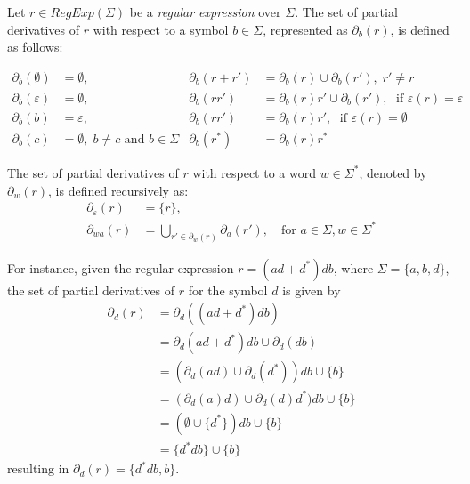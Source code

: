 Let $r \in RegExp(\Sigma)$ be a \textit{regular expression} over $\Sigma$. The set of partial derivatives of $r$ with respect to a symbol $b \in \Sigma$, represented as $\partial_b(r)$, is defined as follows:

\begin{align*}
	\partial_b(\emptyset) &= \emptyset,		&	\partial_b(r + r') &= \partial_b(r) \cup \partial_b(r'), \; r' \neq r \\
	\partial_b(\varepsilon) &= \emptyset,	&	\partial_b(r r') &= \partial_b(r)r' \cup \partial_b(r'), \; \text { if } \varepsilon(r) = \varepsilon \\
	\partial_b(b) &= \varepsilon, & \partial_b(r r') &= \partial_b(r)r', \; \text { if } \varepsilon(r) = \emptyset \\
	\partial_b(c) &= \emptyset, \; b \neq c \text{ and } b \in \Sigma & \partial_b(r^*) &= \partial_b(r)r^*
\end{align*}

The set of partial derivatives of $r$ with respect to a word $w \in \Sigma^*$, denoted by $\partial_w(r)$, is defined recursively as:
\begin{align*}
	\partial_{\varepsilon}(r) &= \{r\}, \\
	\partial_{wa}(r) &= \bigcup_{r' \in \partial_w(r)} \partial_a(r'), \quad \text{for $a \in \Sigma, w \in \Sigma^*$}
\end{align*}

For instance, given the regular expression $r = (ad + d^*)db$, where $\Sigma = \{a,b,d\}$, the set of partial derivatives of $r$ for the symbol $d$ is given by
\begin{align*}
	\partial_d(r) &= \partial_d((ad + d^*)db) \\
	&= \partial_d(ad+d^*)db \cup \partial_d(db) \\
	&= (\partial_d(ad) \cup \partial_d(d^*))db \cup \{b\} \\
	&= (\partial_d(a)d) \cup \partial_d(d)d^*)db \cup \{b\} \\
	&= (\emptyset \cup \{d^*\})db \cup \{b\} \\
	&= \{d^*db\} \cup \{b\}
\end{align*}
resulting in $\partial_d(r) = \{d^*db, b\}$.

